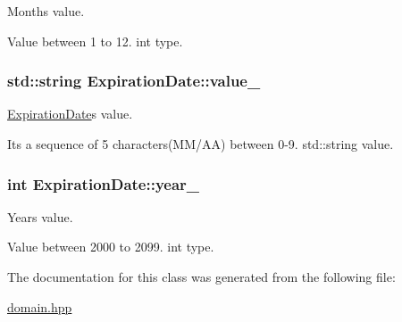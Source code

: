 Month\textquotesingle{}s value. 

Value between 1 to 12. int type. 
\subsubsection[{\texorpdfstring{value\+\_\+}{value_}}]{\setlength{\rightskip}{0pt plus 5cm}std\+::string Expiration\+Date\+::value\+\_\+\hspace{0.3cm}{\ttfamily [private]}}\hypertarget{classExpirationDate_ad7f3f57106f31c50573fc15792f8f784}{}\label{classExpirationDate_ad7f3f57106f31c50573fc15792f8f784}


\hyperlink{classExpirationDate}{Expiration\+Date}\textquotesingle{}s value. 

It\textquotesingle{}s a sequence of 5 characters(M\+M/\+AA) between 0-\/9. std\+::string value. 
\subsubsection[{\texorpdfstring{year\+\_\+}{year_}}]{\setlength{\rightskip}{0pt plus 5cm}int Expiration\+Date\+::year\+\_\+\hspace{0.3cm}{\ttfamily [private]}}\hypertarget{classExpirationDate_a8311d413f31ed2b108dce8e790506cd7}{}\label{classExpirationDate_a8311d413f31ed2b108dce8e790506cd7}


Year\textquotesingle{}s value. 

Value between 2000 to 2099. int type. 

The documentation for this class was generated from the following file\+:\begin{DoxyCompactItemize}
\item 
\hyperlink{domain_8hpp}{domain.\+hpp}\end{DoxyCompactItemize}
